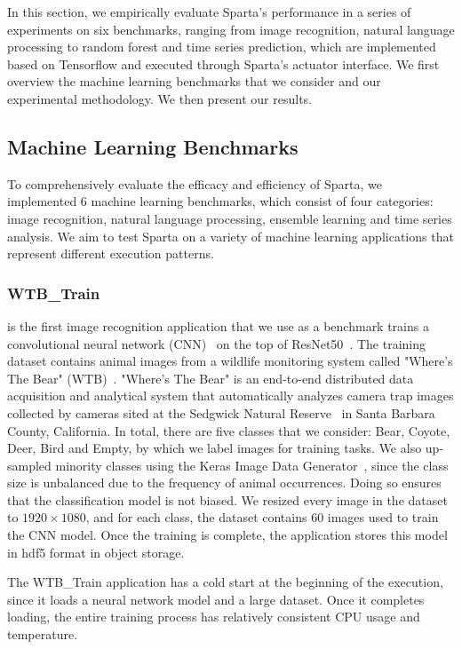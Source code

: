 In this section, we empirically evaluate Sparta's performance in a series of experiments on six benchmarks, ranging from image recognition, natural language processing to random forest and time series prediction, which are implemented based on Tensorflow and executed through Sparta's actuator interface. We first overview the machine learning benchmarks that we consider and our experimental methodology. We then present our results.

\subsection{Machine Learning Benchmarks}

To comprehensively evaluate the efficacy and efficiency of Sparta, we implemented 6 machine learning benchmarks, which consist of four categories: image recognition, natural language processing, ensemble learning and time series analysis. We aim to test Sparta on a variety of machine learning applications that represent different execution patterns.

\subsubsection{WTB\_Train}

is the first image recognition application that we use as a benchmark trains a convolutional neural network (CNN)~\cite{ref:cnn} on the top of ResNet50~\cite{ref:resnet}. The training dataset contains animal images from a wildlife monitoring system called "Where's The Bear" (WTB)~\cite{ref:wtb}. "Where's The Bear" is an end-to-end distributed data acquisition and analytical system that automatically analyzes camera trap images collected by cameras sited at the Sedgwick Natural Reserve~\cite{ref:sedgwick} in Santa Barbara County, California. In total, there are five classes that we consider: Bear, Coyote, Deer, Bird and Empty, by which we label images for training tasks. We also up-sampled minority classes using the Keras Image Data Generator~\cite{ref:datagen}, since the class size is unbalanced due to the frequency of animal occurrences. Doing so ensures that the classification model is not biased. We resized every image in the dataset to $1920 \times 1080$, and for each class, the dataset contains 60 images used to train the CNN model. Once the training is complete, the application stores this model in hdf5 format in object storage. 

The WTB\_Train application has a cold start at the beginning of the execution, since it loads a neural network model and a large dataset. Once it completes loading, the entire training process has relatively consistent CPU usage and temperature. 

